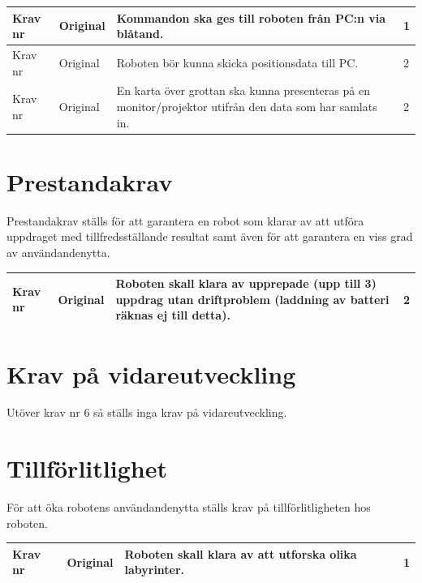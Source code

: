 \documentclass[11pt]{article}
\newcounter{kravc}
\newcommand{\kravcc}{
	\thekravc
	\stepcounter{kravc}
}
\begin{document}
\begin{flushleft}
\begin{center}
\begin{longtable}{|l|l|p{.70\linewidth}|l|}
Krav nr\kravcc &
Original &
Kommandon ska ges till roboten från PC:n via blåtand. &
1 \\ \hline

Krav nr\kravcc &
Original &
Roboten bör kunna skicka positionsdata till PC. &
2 \\ \hline

Krav nr\kravcc &
Original &
En karta över grottan ska kunna presenteras på en monitor/projektor utifrån den data som har samlats in. &
2 \\ \hline
\end{longtable}
\end{center}


\section{Prestandakrav}
Prestandakrav ställs för att garantera en robot som klarar av att utföra uppdraget med tillfredsställande resultat samt även för att garantera en viss grad av användandenytta.

\begin{center}
\begin{longtable}{|l|l|p{.70\linewidth}|l|} \hline

Krav nr\kravcc &
Original &
Roboten skall klara av upprepade (upp till 3) uppdrag utan driftproblem (laddning av batteri räknas ej till detta). &
2 \\ \hline

\end{longtable}
\end{center}

\section{Krav på vidareutveckling}
Utöver krav nr 6 så ställs inga krav på vidareutveckling.

\section{Tillförlitlighet}
För att öka robotens användandenytta ställs krav på tillförlitligheten hos roboten.

\begin{center}
\begin{longtable}{|l|l|p{.70\linewidth}|l|} \hline

Krav nr\kravcc &
Original &
Roboten skall klara av att utforska olika labyrinter. &
1 \\ \hline


\end{longtable}
\end{center}
\end{flushleft}
\end{document}
